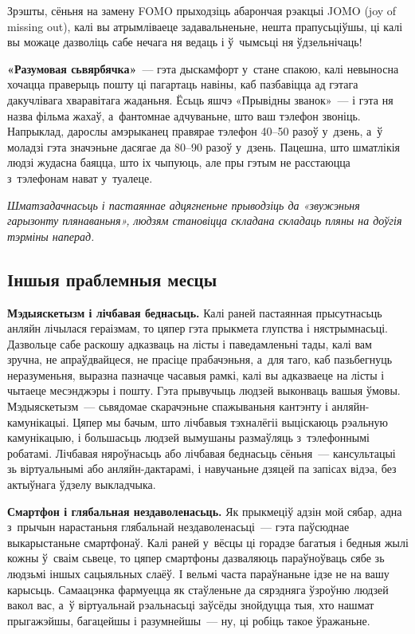 
Зрэшты, сёньня на замену FOMO прыходзіць абарончая рэакцыі JOMO (joy of missing out), калі вы атрымліваеце задавальненьне, нешта прапусьціўшы, ці калі вы можаце дазволіць сабе нечага ня ведаць і ў~чымсьці ня ўдзельнічаць!

\textbf{«Разумовая сьвярбячка»}~--- гэта дыскамфорт у~стане спакою, калі невыносна хочацца праверыць пошту ці пагартаць навіны, каб пазбавіцца ад гэтага дакучлівага хваравітага жаданьня. Ёсьць яшчэ «Прывідны званок»~--- і гэта ня назва фільма жахаў, а~фантомнае адчуваньне, што ваш тэлефон звоніць. Напрыклад, дарослы амэрыканец правярае тэлефон 40--50 разоў у~дзень, а~ў моладзі гэта значэньне дасягае да 80--90 разоў у~дзень. Пацешна, што шматлікія людзі жудасна баяцца, што іх чыпуюць, але пры гэтым не расстаюцца з~тэлефонам нават у~туалеце.

\emph{Шматзадачнасьць і пастаяннае адцягненьне прыводзіць да «звужэньня гарызонту плянаваньня», людзям становіцца складана складаць пляны на доўгія тэрміны наперад.}

\subsection*{Іншыя праблемныя месцы}

\textbf{Мэдыяскетызм і лічбавая беднасьць.} Калі раней пастаянная прысутнасьць анляйн лічылася гераізмам, то цяпер гэта прыкмета глупства і нястрымнасьці. Дазвольце сабе раскошу адказваць на лісты і паведамленьні тады, калі вам зручна, не апраўдвайцеся, не прасіце прабачэньня, а~для таго, каб пазьбегнуць неразуменьня, выразна пазначце часавыя рамкі, калі вы адказваеце на лісты і чытаеце месэнджэры і пошту. Гэта прывучыць людзей выконваць вашыя ўмовы. Мэдыяскетызм~--- сьвядомае скарачэньне спажываньня кантэнту і анляйн-камунікацыі. Цяпер мы бачым, што лічбавыя тэхналёгіі выціскаюць рэальную камунікацыю, і большасьць людзей вымушаны размаўляць з~тэлефоннымі робатамі. Лічбавая няроўнасьць або лічбавая беднасьць сёньня~--- кансультацыі зь віртуальнымі або анляйн-дактарамі, і навучаньне дзяцей па запісах відэа, без актыўнага ўдзелу выкладчыка.


\textbf{Смартфон і глябальная нездаволенасьць.} Як прыкмеціў адзін мой сябар, адна з~прычын нарастаньня глябальнай нездаволенасьці~--- гэта паўсюднае выкарыстаньне смартфонаў. Калі раней у~вёсцы ці горадзе багатыя і бедныя жылі кожны ў~сваім сьвеце, то цяпер смартфоны дазваляюць параўноўваць сябе зь людзьмі іншых сацыяльных слаёў. І вельмі часта параўнаньне ідзе не на вашу карысьць. Самаацэнка фармуецца як стаўленьне да сярэдняга ўзроўню людзей вакол вас, а~ў віртуальнай рэальнасьці заўсёды знойдуцца тыя, хто нашмат прыгажэйшы, багацейшы і разумнейшы~--- ну, ці робіць такое ўражаньне.

